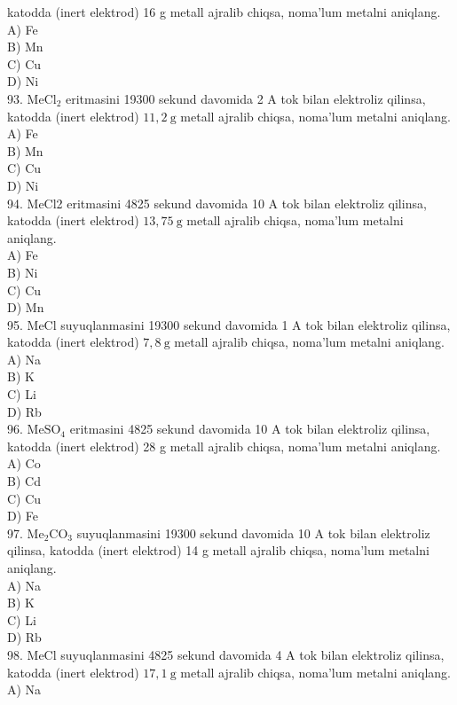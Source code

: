 katodda (inert elektrod) 16 g metall ajralib chiqsa, noma'lum metalni aniqlang.\\
A) Fe\\
B) Mn\\
C) Cu\\
D) Ni\\
93. $\mathrm{MeCl}_{2}$ eritmasini 19300 sekund davomida 2 A tok bilan elektroliz qilinsa, katodda (inert elektrod) $11,2 \mathrm{~g}$ metall ajralib chiqsa, noma'lum metalni aniqlang.\\
A) Fe\\
B) Mn\\
C) Cu\\
D) Ni\\
94. MeCl2 eritmasini 4825 sekund davomida 10 A tok bilan elektroliz qilinsa, katodda (inert elektrod) $13,75 \mathrm{~g}$ metall ajralib chiqsa, noma'lum metalni aniqlang.\\
A) Fe\\
B) Ni\\
C) Cu\\
D) Mn\\
95. MeCl suyuqlanmasini 19300 sekund davomida 1 A tok bilan elektroliz qilinsa, katodda (inert elektrod) $7,8 \mathrm{~g}$ metall ajralib chiqsa, noma'lum metalni aniqlang.\\
A) Na\\
B) K\\
C) Li\\
D) Rb\\
96. $\mathrm{MeSO}_{4}$ eritmasini 4825 sekund davomida 10 A tok bilan elektroliz qilinsa, katodda (inert elektrod) 28 g metall ajralib chiqsa, noma'lum metalni aniqlang.\\
A) Co\\
B) Cd\\
C) Cu\\
D) Fe\\
97. $\mathrm{Me}_{2} \mathrm{CO}_{3}$ suyuqlanmasini 19300 sekund davomida 10 A tok bilan elektroliz qilinsa, katodda (inert elektrod) 14 g metall ajralib chiqsa, noma'lum metalni aniqlang.\\
A) Na\\
B) K\\
C) Li\\
D) Rb\\
98. MeCl suyuqlanmasini 4825 sekund davomida 4 A tok bilan elektroliz qilinsa, katodda (inert elektrod) $17,1 \mathrm{~g}$ metall ajralib chiqsa, noma'lum metalni aniqlang.\\
A) Na\\
